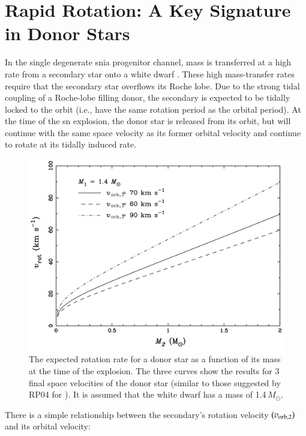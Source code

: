 \section{Rapid Rotation: A Key Signature in  Donor Stars}
\label{sec:sn1572_starg_rot}
In the single degenerate \gls{snia} progenitor channel, mass is transferred
at a high rate from a secondary star onto a white dwarf \citep{Nomoto:1982p451,Nomoto:2007p480}. These high
mass-transfer rates require that the secondary star overflows its
Roche lobe. Due to the strong tidal coupling of a Roche-lobe filling
donor, the secondary is expected to be tidally locked to the orbit
(i.e., have the same rotation period as the orbital period).  At the
time of the \gls{sn} explosion, the donor star is released from its orbit, but
will continue with the same space velocity as its former orbital
velocity and continue to rotate at its tidally induced rate.

\begin{figure}[h!]
\centering
\includegraphics*[width=\textwidth]{chapter_sn1572_starg/plots/theo_rot_podsi.pdf}
\caption[Expected rotation for Tycho-G]{The expected rotation rate for a donor star as a function of
its mass at the time of the explosion. The three curves show the results for 3 final space
velocities of the donor star (similar to those suggested by RP04 for \starg). It
is assumed that the white dwarf has a mass of 1.4\,$M_\odot$.}
\label{fig:theorot}
\end{figure}

There is a simple relationship between the secondary's rotation
velocity $(v_{\rm orb, 2})$ and its orbital velocity:

